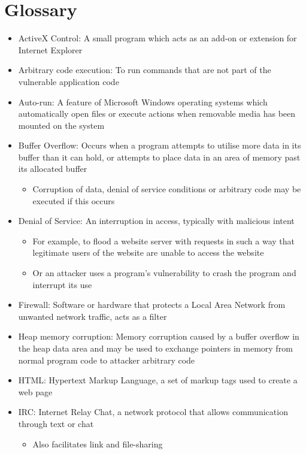 \section{Glossary}

\begin{itemize}
\item ActiveX Control: A small program which acts as an add-on or extension for Internet Explorer \citep{Hoffman2013}
\item Arbitrary code execution: To run commands that are not part of the vulnerable application code
\item Auto-run: A feature of Microsoft Windows operating systems which automatically open files or execute actions when removable media has been mounted on the system
\item Buffer Overflow: Occurs when a program attempts to utilise more data in its buffer than it can hold, or attempts to place data in an area of memory  past its allocated buffer \citep{Ferragamo2014}
	\begin{itemize}
	\item Corruption of data, denial of service conditions or arbitrary code may be executed if this occurs	
	\end{itemize}
\item Denial of Service: An interruption in access, typically with malicious intent
	\begin{itemize}
	\item For example, to flood a website server with requests in such a way that legitimate users of the website are unable to access the website
	\item Or an attacker uses a program's vulnerability to crash the program and interrupt its use
	\end{itemize}
\item Firewall: Software or hardware that protects a Local Area Network from unwanted network traffic, acts as a filter
\item Heap memory corruption: Memory corruption caused by a buffer overflow in the heap data area and may be used to exchange pointers in memory from normal program code to attacker arbitrary code \citep{Wikipedia2014, MITRE2014c}
\item HTML: Hypertext Markup Language, a set of markup tags used to create a web page
\item IRC: Internet Relay Chat, a network protocol that allows communication through text or chat
	\begin{itemize}
	\item Also facilitates link and file-sharing

\end{itemize}
\end{itemize}
